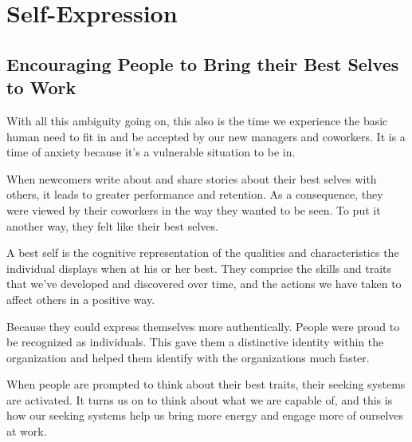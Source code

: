 \documentclass[ebook,12pt,oneside,openany]{memoir}
\begin{document}
\section{Self-Expression}
\subsection{Encouraging People to Bring their Best Selves to Work}
With all this ambiguity going on, this also is the time we experience the basic human need to fit in and 
be accepted by our new managers and coworkers. 
It is a time of anxiety because it's a vulnerable situation to be in.

When newcomers write about and share stories about their best selves with others,
it leads to greater performance and retention. 
As a consequence, they were viewed by their coworkers in the way they wanted to be seen. 
To put it another way, they felt like their best selves. 

A best self is the cognitive representation of the qualities and characteristics the individual displays when at his or her best.
They comprise the skills and traits that we've developed and discovered over time, and the actions we have taken to affect others in a positive way.

Because they could express themselves more authentically. 
People were proud to be recognized as individuals. 
This gave them a distinctive identity within the organization and helped them identify 
with the organizations much faster. 

When people are prompted to think about their best traits, their seeking systems are activated.
It turns us on to think about what we are capable of, and this is how our seeking systems help us bring more energy and engage more of ourselves at work.
\end{document}
